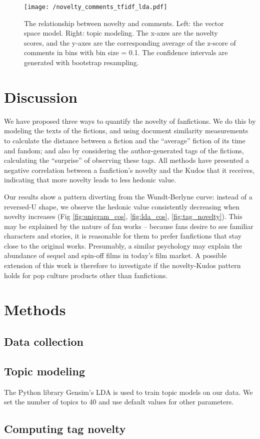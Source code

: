 \documentclass[a4paper]{article}
\begin{document}
\begin{figure}
    \centering
          \texttt{[image: /novelty\_comments\_tfidf\_lda.pdf]}
        \caption{The relationship between novelty and comments. Left: the vector space model. Right: topic modeling. The x-axes are the novelty scores, and the y-axes are the corresponding average of the z-score of comments in bins with bin size = 0.1. The confidence intervals are generated with bootstrap resampling. }
        \label{fig:tfidf_lda_comments}
\end{figure}


\section*{Discussion}
We have proposed three ways to quantify the novelty of fanfictions. We do this by modeling the texts of the fictions, and using document similarity measurements to calculate the distance between a fiction and the ``average'' fiction of its time and fandom; and also by considering the author-generated tags of the fictions, calculating the ``surprise'' of observing these tags. All methods have presented a negative correlation between a fanfiction's novelty and the Kudos that it receives, indicating that more novelty leads to less hedonic value.

Our results show a pattern diverting from the Wundt-Berlyne curve: instead of a reversed-U shape, we observe the hedonic value consistently decreasing when novelty increases (Fig \ref{fig:unigram_cos}, \ref{fig:lda_cos}, \ref{fig:tag_novelty}). This may be explained by the nature of fan works -- because fans desire to see familiar characters and stories, it is reasonable for them to prefer fanfictions that stay close to the original works. Presumably, a similar psychology may explain the abundance of sequel and spin-off films in today's film market. A possible extension of this work is therefore to investigate if the novelty-Kudos pattern holds for pop culture products other than fanfictions. 


\section*{Methods}

\subsection*{Data collection}


\subsection*{Topic modeling}
The Python library Gensim's LDA \cite{gensimlda} is used to train topic models on our data. We set the number of topics to 40 and use default values for other parameters. 
\subsection*{Computing tag novelty}






    
\end{document}
